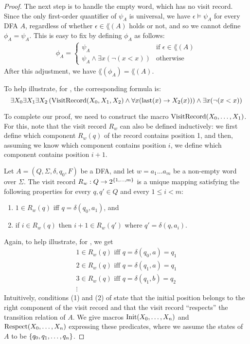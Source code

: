 \documentclass[11pt,twoside=off,numbers=noenddot]{scrbook}
\begin{document}
\begin{proof}
  The next step is to handle the empty word, which has no visit
  record. Since the only first-order quantifier of $\psi_A$ is
  universal, we have $\epsilon \models \psi_A$ for every DFA $A$,
  regardless of whether $\epsilon \in \lang(A)$ holds or not, and so
  we cannot define $\phi_A = \psi_A$. This is easy to fix by defining
  $\phi_A$ as follows:
  \begin{align*}
    \phi_A =
    \begin{cases}
      \psi_A & \text{if $\epsilon \in \lang(A)$} \\
      \psi_A \wedge \exists x (\neg (x < x)) & \text{otherwise}
    \end{cases}
  \end{align*}
  After this adjustment, we have $\lang(\phi_A) = \lang(A)$.

  To help illustrate, for , the corresponding formula is:
  \[ \exists X_0 \exists X_1 \exists X_2 \left( \text{VisitRecord}(X_0,
    X_1, X_2) \wedge \forall x (\text{last}(x) \rightarrow X_2(x)) \right)
  \wedge \exists x (\neg (x < x)) \]

  To complete our proof, we need to construct the macro
  $\text{VisitRecord}(X_0, \dots, X_1)$. For this, note that the visit
  record $R_w$ can also be defined inductively: we first define which
  component $R_w(q)$ of the record contains position 1, and then,
  assuming we know which component contains position $i$, we define
  which component contains position $i + 1$.

  \begin{proposition}
    Let $A = (Q, \Sigma, \delta, q_0, F)$ be a DFA, and let $w = a_1
    \dots a_m$ be a non-empty word over $\Sigma$. The visit record
    $R_w : Q \to 2^{\{ 1, \dots, m \}}$ is a unique mapping
    satisfying the following properties for every $q, q' \in Q$ and
    every $1 \leq i < m$:
    \begin{enumerate}
      \item $1 \in R_w(q)$ iff $q = \delta(q_0, a_1)$, and
      \item if $i \in R_w(q)$ then $i + 1 \in R_w(q')$ where $q' =
        \delta(q, a_i)$.
    \end{enumerate}
  \end{proposition}

  Again, to help illustrate, for , we get
  \begin{gather*}
    \text{$1 \in R_w(q)$ iff $q = \delta(q_0, a) = q_1$} \\
    \text{$2 \in R_w(q)$ iff $q = \delta(q_1, a) = q_1$} \\
    \text{$3 \in R_w(q)$ iff $q = \delta(q_1, b) = q_2$} \\
    \vdots
  \end{gather*}
  Intuitively, conditions (1) and (2) of
   state that the initial position
  belongs to the right component of the visit record and that the
  visit record ``respects'' the transition relation of $A$. We give
  macros $\text{Init}(X_0, \dots, X_n)$ and $\text{Respect}(X_0, \dots, X_n)$
  expressing these predicates, where we assume the states of $A$ to
  be $\{ q_0, q_1, \dots, q_n \}$.


\end{proof}
\end{document}
